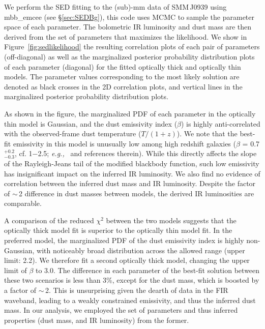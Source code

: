 \documentclass[twocolumn,apj,numberedappendix]{emulateapj}
\newcommand{\eg}{{\sl e.g.,~}}
\begin{document}
\appendix
We perform the SED fitting to the (sub)-mm data of SMM\,J0939 using {\sc mbb\_emcee} (see \S \ref{sec:SEDBg}), this code uses MCMC to sample the parameter space of each parameter. The bolometric IR luminosity and dust mass are then derived from the set of parameters that maximizes the likelihood.
We show in Figure~\ref{fig:sedlikelihood} the resulting correlation plots of each pair of parameters (off-diagonal) as well as the marginalized posterior probability distribution plots of each parameter (diagonal) for the fitted optically thick and optically thin models.
The parameter values corresponding to the most likely solution are denoted as black crosses in the 2D correlation plots, and vertical lines in the marginalized posterior probability distribution plots. \par

As shown in the figure, the marginalized PDF of each parameter in the optically thin model is Gaussian, and
the dust emissivity index ($\beta$) is highly anti-correlated with the observed-frame dust temperature ($T/(1+z)$).
We note that the best-fit emissivity in this model is unusually low among high redshift galaxies ($\beta$ = 0.7$^{+0.2}_{-0.3}$, cf. 1$-$2.5; \eg \citet{Casey12a} and references therein). While this directly affects the slope of the Rayleigh-Jeans tail of the modified blackbody function, such low emissivity has insignificant impact on the inferred IR luminosity.
We also find no evidence of correlation between the inferred dust mass and IR luminosity. Despite the factor of $\sim$\,2 difference
in dust masses
between models, the derived IR luminosities are comparable.

A comparison of the reduced $\chi^2$ between the two models suggests that the optically thick model fit is superior to the optically thin model fit. In the preferred model, the marginalized PDF of the dust emissivity index is highly non-Gaussian, with noticeably broad distribution across
the allowed range (upper limit: 2.2). We therefore fit a second optically thick model, changing the upper limit of $\beta$ to 3.0. The difference in each
parameter of the best-fit solution between these two scenarios is less than 3\%, except for the dust mass, which is boosted by a factor of $\sim$\,2. This is
unsurprising given the dearth of data in the FIR waveband, leading to a weakly constrained emissivity, and thus the inferred dust mass.
In our analysis, we employed the set of parameters and thus inferred properties (dust mass, and IR luminosity) from the former.
\end{document}
